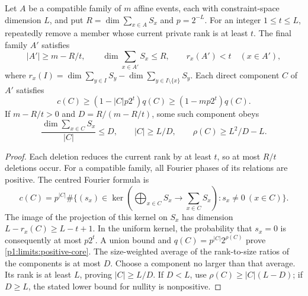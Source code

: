 \begin{lemma}
\label{p1:limits:peeling}
Let $A$ be a compatible family of $m$ affine events, each with
constraint-space dimension $L$, and put
$R=\dim\sum_{x\in A}S_x$ and $p=2^{-L}$.
For an integer $1\le t\le L$, repeatedly remove a member whose
current private rank is at least $t$.  The final family $A'$ satisfies
\[
 |A'|\ge m-R/t,\qquad
 \dim\sum_{x\in A'}S_x\le R,\qquad
 r_x(A')<t\quad(x\in A'),
\]
where $r_x(I)=\dim\sum_{y\in I}S_y-
\dim\sum_{y\in I\setminus\{x\}}S_y$.
Each direct component $C$ of $A'$ satisfies
\begin{equation}
 c(C)\ge(1-|C|p2^t)q(C)\ge(1-mp2^t)q(C).
 \label{p1:limits:positive-core}
\end{equation}
If $m-R/t>0$ and $D=R/(m-R/t)$, some such component obeys
\begin{equation}
 \frac{\dim\sum_{x\in C}S_x}{|C|}\le D,\qquad
 |C|\ge L/D,\qquad \rho(C)\ge L^2/D-L.
 \label{p1:limits:rank-density}
\end{equation}
\end{lemma}
\begin{proof}
Each deletion reduces the current rank by at least $t$, so at
most $R/t$ deletions occur.  For a compatible family, all Fourier
phases of its relations are positive.  The centred Fourier formula is
\[
 c(C)=p^{|C|}\#\{(s_x)\in\ker(\bigoplus_{x\in C}S_x
                        \longrightarrow\sum_{x\in C}S_x):
                                      s_x\ne0\ (x\in C)\}.
\]
The image of the projection of this kernel on $S_x$ has dimension
$L-r_x(C)\ge L-t+1$.  In the uniform kernel, the probability
that $s_x=0$ is consequently at most $p2^t$.
A union bound and $q(C)=p^{|C|}2^{\rho(C)}$ prove
\eqref{p1:limits:positive-core}.  The size-weighted average of
the rank-to-size ratios of the components is at most $D$.
Choose a component no larger than that average.  Its rank is
at least $L$, proving $|C|\ge L/D$.  If $D<L$, use
$\rho(C)\ge|C|(L-D)$; if $D\ge L$, the stated lower bound
for nullity is nonpositive.
\end{proof}

